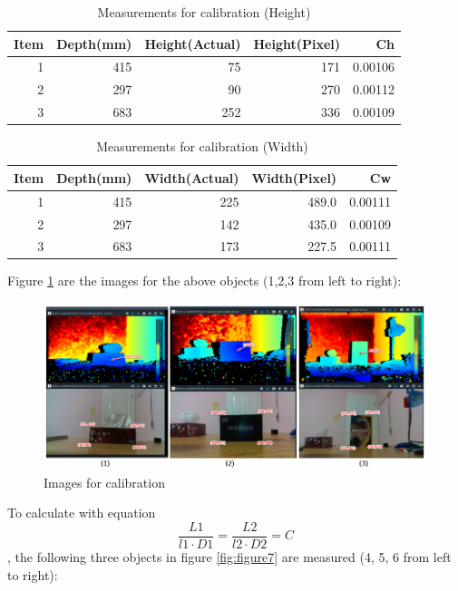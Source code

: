 \documentclass[
  oneside]{ubcthesis}
\begin{document}
\begin{table}

\caption{\label{tab:mytable1}Measurements for calibration (Height)}
\centering
\begin{tabular}[t]{rrrrr}
\toprule
Item & Depth(mm) & Height(Actual) & Height(Pixel) & Ch\\
\midrule
1 & 415 & 75 & 171 & 0.00106\\
2 & 297 & 90 & 270 & 0.00112\\
3 & 683 & 252 & 336 & 0.00109\\
\bottomrule
\end{tabular}
\end{table}

\begin{table}

\caption{\label{tab:mytable2}Measurements for calibration (Width)}
\centering
\begin{tabular}[t]{rrrrr}
\toprule
Item & Depth(mm) & Width(Actual) & Width(Pixel) & Cw\\
\midrule
1 & 415 & 225 & 489.0 & 0.00111\\
2 & 297 & 142 & 435.0 & 0.00109\\
3 & 683 & 173 & 227.5 & 0.00111\\
\bottomrule
\end{tabular}
\end{table}

Figure \ref{fig:figure6} are the images for the above objects (1,2,3 from left to right):

\begin{figure}

{\centering \includegraphics[width=0.9\linewidth]{figures/6} 

}

\caption{Images for calibration}\label{fig:figure6}
\end{figure}



To calculate with equation \[\frac{L1}{l1 \cdot D1} = \frac{L2}{l2 \cdot D2} = C\], the following three objects in figure \ref{fig:figure7} are measured (4, 5, 6 from left to right):
\end{document}
